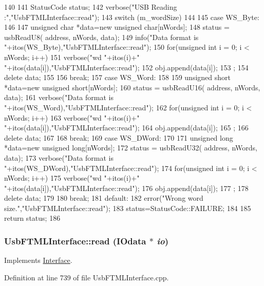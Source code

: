 \begin{DoxyCode}
140 {
141   StatusCode status;
142   verbose("USB Reading :","UsbFTMLInterface::read");
143   switch (m_wordSize)
144   {
145   case WS_Byte:
146     {  
147       unsigned char *data=new unsigned char[nWords];
148       status = usbReadU8( address, nWords, data);
149       info("Data format is "+itos(WS_Byte),"UsbFTMLInterface::read");
150       for(unsigned int i = 0; i < nWords; i++){
151         verbose("wd "+itos(i)+" "+itos(data[i]),"UsbFTMLInterface::read");
152         obj.append(data[i]);
153       };
154       delete data;
155     }
156     break;
157   case WS_Word:
158     {
159       unsigned short *data=new unsigned short[nWords];
160       status = usbReadU16( address, nWords, data);
161       verbose("Data format is "+itos(WS_Word),"UsbFTMLInterface::read");
162       for(unsigned int i = 0; i < nWords; i++){
163         verbose("wd "+itos(i)+" "+itos(data[i]),"UsbFTMLInterface::read");
164         obj.append(data[i]);
165       };
166       delete data;
167     }
168     break;
169   case WS_DWord:
170     {
171       unsigned long *data=new unsigned long[nWords];
172       status = usbReadU32( address, nWords, data);
173       verbose("Data format is "+itos(WS_DWord),"UsbFTMLInterface::read");
174       for(unsigned int i = 0; i < nWords; i++){
175         verbose("wd "+itos(i)+" "+itos(data[i]),"UsbFTMLInterface::read");
176         obj.append(data[i]);
177       };
178       delete data;
179     }
180     break;    
181   default:
182     error("Wrong word size.","UsbFTMLInterface::read");
183     status=StatusCode::FAILURE;
184   }
185   return status;
186 }
\end{DoxyCode}
\hypertarget{classUsbFTMLInterface_a9999929c6169c8b4ebe57b687b2dac28}{
\subsubsection[{read}]{ UsbFTMLInterface::read ({\bf IOdata} $\ast$ {\em io})}}
\label{classUsbFTMLInterface_a9999929c6169c8b4ebe57b687b2dac28}


Implements \hyperlink{classInterface_a99136b67c8e6cbcaa0477c36940ac2ef}{Interface}.

Definition at line 739 of file UsbFTMLInterface.cpp.

